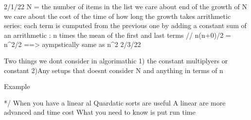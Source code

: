 2/1/22
N = the number of items in the list
we care about end of the growth of N
we care about the cost of the time of how long the growth takes 
arrithmetic series: each term is cumputed from the previous one by adding a constant 
sum of an arrithmetic : n times the mean of the first and last terms
// n(n+0)/2 = n^2/2 ==> aympstically same as n^2
2/3/22

Two things we dont consider in algorimathic
1) the constant multiplyers or constant
2)Any setups that doesnt consider N and
anything in terms of n


Example 





*/
When you have a linear al
Quardatic sorts are useful 
A linear are more advanced and time cost
What you need to know is 
put run time 

